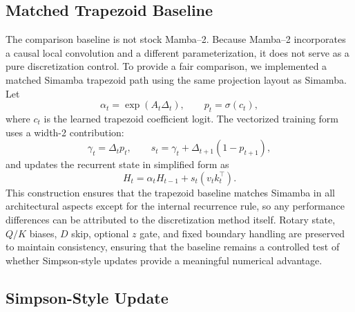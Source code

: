 \documentclass[conference]{IEEEtran}
\newcommand{\modelname}{Simamba\xspace}
\newcommand{\mambatwo}{Mamba--2\xspace}
\begin{document}
\subsection{Matched Trapezoid Baseline}

The comparison baseline is not stock \mambatwo. Because \mambatwo incorporates a causal local convolution and a different parameterization, it does not serve as a pure discretization control. To provide a fair comparison, we implemented a matched \modelname trapezoid path using the same projection layout as \modelname. Let
\begin{equation}
    \alpha_t=\exp(A_t\Delta_t), \qquad p_t = \sigma(c_t),
\end{equation}
where $c_t$ is the learned trapezoid coefficient logit. The vectorized training form uses a width-2 contribution:
\begin{equation}
    \gamma_t = \Delta_t p_t,\qquad
    s_t = \gamma_t + \Delta_{t+1}(1-p_{t+1}),
\end{equation}
and updates the recurrent state in simplified form as
\begin{equation}
    H_t = \alpha_t H_{t-1} + s_t(v_tk_t^\top).
\end{equation}
This construction ensures that the trapezoid baseline matches \modelname in all architectural aspects except for the internal recurrence rule, so any performance differences can be attributed to the discretization method itself. Rotary state, $Q/K$ biases, $D$ skip, optional $z$ gate, and fixed boundary handling are preserved to maintain consistency, ensuring that the baseline remains a controlled test of whether Simpson-style updates provide a meaningful numerical advantage.

\subsection{Simpson-Style Update}
\end{document}
